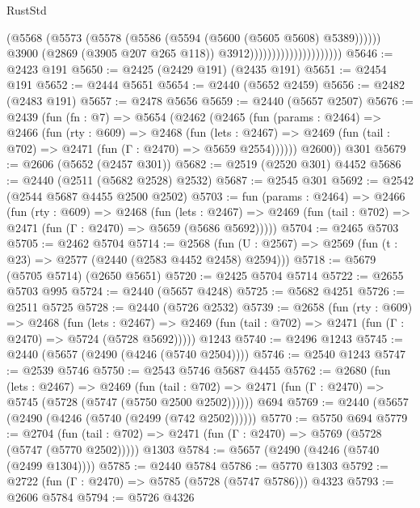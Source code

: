 \begin{lexlean}{RustStd}
\begin{coremodule}
                                              (@5568
                                                (@5573
                                                  (@5578
                                                    (@5586 (@5594 (@5600 (@5605 @5608) @5389))))))
                                              @3900
                                              (@2869 (@3905 @207 @265 @118))
                                              @3912)))))))))))))))))))))
@5646 := @2423 @191
@5650 := @2425 (@2429 @191) (@2435 @191)
@5651 := @2454 @191
@5652 := @2444 @5651
@5654 := @2440 (@5652 @2459)
@5656 := @2482 (@2483 @191)
@5657 := @2478 @5656
@5659 := @2440 (@5657 @2507)
@5676 := @2439
    (fun (fn : @7) =>
    @5654
      (@2462
        (@2465
          (fun (params : @2464) =>
          @2466
            (fun (rty : @609) =>
            @2468
              (fun (lets : @2467) =>
              @2469 (fun (tail : @702) => @2471 (fun (Γ : @2470) => @5659 @2554))))))
        @2600))
    @301
@5679 := @2606 (@5652 (@2457 @301))
@5682 := @2519 (@2520 @301) @4452
@5686 := @2440 (@2511 (@5682 @2528) @2532)
@5687 := @2545 @301
@5692 := @2542 (@2544 @5687 @4455 @2500 @2502)
@5703 := fun (params : @2464) =>
  @2466
    (fun (rty : @609) =>
    @2468
      (fun (lets : @2467) =>
      @2469 (fun (tail : @702) => @2471 (fun (Γ : @2470) => @5659 (@5686 @5692)))))
@5704 := @2465 @5703
@5705 := @2462 @5704
@5714 := @2568 (fun (U : @2567) => @2569 (fun (t : @23) => @2577 (@2440 (@2583 @4452 @2458) @2594)))
@5718 := @5679 (@5705 @5714) (@2650 @5651)
@5720 := @2425 @5704 @5714
@5722 := @2655 @5703 @995
@5724 := @2440 (@5657 @4248)
@5725 := @5682 @4251
@5726 := @2511 @5725
@5728 := @2440 (@5726 @2532)
@5739 := @2658
    (fun (rty : @609) =>
    @2468
      (fun (lets : @2467) =>
      @2469 (fun (tail : @702) => @2471 (fun (Γ : @2470) => @5724 (@5728 @5692)))))
    @1243
@5740 := @2496 @1243
@5745 := @2440 (@5657 (@2490 (@4246 (@5740 @2504))))
@5746 := @2540 @1243
@5747 := @2539 @5746
@5750 := @2543 @5746 @5687 @4455
@5762 := @2680
    (fun (lets : @2467) =>
    @2469
      (fun (tail : @702) => @2471 (fun (Γ : @2470) => @5745 (@5728 (@5747 (@5750 @2500 @2502))))))
    @694
@5769 := @2440 (@5657 (@2490 (@4246 (@5740 (@2499 (@742 @2502))))))
@5770 := @5750 @694
@5779 := @2704
    (fun (tail : @702) => @2471 (fun (Γ : @2470) => @5769 (@5728 (@5747 (@5770 @2502)))))
    @1303
@5784 := @5657 (@2490 (@4246 (@5740 (@2499 @1304))))
@5785 := @2440 @5784
@5786 := @5770 @1303
@5792 := @2722 (fun (Γ : @2470) => @5785 (@5728 (@5747 @5786))) @4323
@5793 := @2606 @5784
@5794 := @5726 @4326

\end{coremodule}
\end{lexlean}
